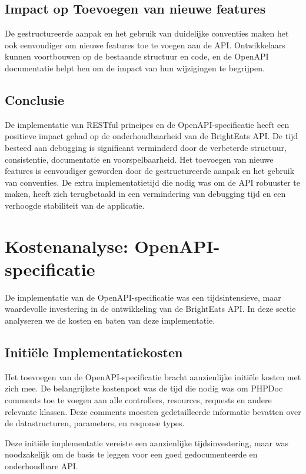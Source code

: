 \subsection{Impact op Toevoegen van nieuwe features}

De gestructureerde aanpak en het gebruik van duidelijke conventies maken het ook eenvoudiger om nieuwe features toe te voegen aan de API. Ontwikkelaars kunnen voortbouwen op de bestaande structuur en code, en de OpenAPI documentatie helpt hen om de impact van hun wijzigingen te begrijpen.

\subsection{Conclusie}

De implementatie van RESTful principes en de OpenAPI-specificatie heeft een positieve impact gehad op de onderhoudbaarheid van de BrightEats API. De tijd besteed aan debugging is significant verminderd door de verbeterde structuur, consistentie, documentatie en voorspelbaarheid. Het toevoegen van nieuwe features is eenvoudiger geworden door de gestructureerde aanpak en het gebruik van conventies. De extra implementatietijd die nodig was om de API robuuster te maken, heeft zich terugbetaald in een vermindering van debugging tijd en een verhoogde stabiliteit van de applicatie.

\section{Kostenanalyse: OpenAPI-specificatie}

De implementatie van de OpenAPI-specificatie was een tijdsintensieve, maar waardevolle investering in de ontwikkeling van de BrightEats API. In deze sectie analyseren we de kosten en baten van deze implementatie.

\subsection{Initiële Implementatiekosten}

Het toevoegen van de OpenAPI-specificatie bracht aanzienlijke initiële kosten met zich mee. De belangrijkste kostenpost was de tijd die nodig was om PHPDoc comments toe te voegen aan alle controllers, resources, requests en andere relevante klassen. Deze comments moesten gedetailleerde informatie bevatten over de datastructuren, parameters, en response types.

Deze initiële implementatie vereiste een aanzienlijke tijdsinvestering, maar was noodzakelijk om de basis te leggen voor een goed gedocumenteerde en onderhoudbare API.

